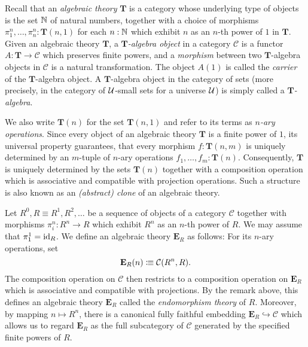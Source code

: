 {
\newcommand{\cat}[1]{\mathcal{#1}}
\newcommand{\theory}[1]{\mathbf{#1}}
\newcommand{\Psh}{\mathop{PSh}}
\newcommand{\Set}{\mathsf{Set}}
\newcommand{\TT}{\theory{T}}
\newcommand{\EE}{\theory{E}}
\newcommand{\Com}{\theory{Com}}
\newcommand{\diffquot}[2]{\frac{\Delta{#1}}{\Delta{#2}}}

Recall that an \emph{algebraic theory} \(\TT\) is a category whose underlying type of objects is the set \(\mathbb{N}\) of natural numbers, together with a choice of morphisms \(\pi^n_1,\dots,\pi^n_n : \TT(n,1)\) for each \(n : \mathbb{N}\) which exhibit \(n\) as an \(n\)-th power of \(1\) in \(\TT\).
Given an algebraic theory \(\TT\), a \emph{\(\TT\)-algebra object} in a category \(\cat C\) is a functor \(A:\TT\to\cat C\) which preserves finite powers, and a \emph{morphism} between two \(\TT\)-algebra objects in \(\cat C\) is a natural transformation.
The object \(A(1)\) is called the \emph{carrier} of the \(\TT\)-algebra object.
A \(\TT\)-algebra object in the category of sets (more precisely, in the category of \(\mathcal{U}\)-small sets for a universe \(\mathcal{U}\)) is simply called a \emph{\(\TT\)-algebra}.

\begin{remark}
  We also write \(\TT(n)\) for the set \(\TT(n,1)\) and refer to its terms as \emph{\(n\)-ary operations}.
  Since every object of an algebraic theory \(\TT\) is a finite power of \(1\), its universal property guarantees, that every morphism \(f:\TT(n,m)\) is uniquely determined by an \(m\)-tuple of \(n\)-ary operations \(f_1,\dots,f_m : \TT(n)\).
  Consequently, \(\TT\) is uniquely determined by the sets \(\TT(n)\) together with a composition operation which is associative and compatible with projection operations.
  Such a structure is also known as an \emph{(abstract) clone} of an algebraic theory.
\end{remark}

\begin{example}
Let \(R^0,R\equiv R^1,R^2,\dots\) be a sequence of objects of a category \(\cat C\) together with morphisms \(\pi^n_i : R^n \to R\) which exhibit \(R^n\) as an \(n\)-th power of \(R\).
We may assume that \(\pi^1_1 = \mathrm{id}_R\).
We define an algebraic theory \(\EE_R\) as follows: For its \(n\)-ary operations, set
\[\EE_R(n) \colonequiv \cat C(R^n,R).\]
The composition operation on \(\cat C\) then restricts to a composition operation on \(\EE_R\) which is associative and compatible with projections.
By the remark above, this defines an algebraic theory \(\EE_R\) called the \emph{endomorphism theory} of \(R\).
Moreover, by mapping \(n\mapsto R^n\), there is a canonical fully faithful embedding \(\EE_R \hookrightarrow \cat C\) which allows us to regard \(\EE_R\) as the full subcategory of \(\cat C\) generated by the specified finite powers of \(R\).
\end{example}

}
